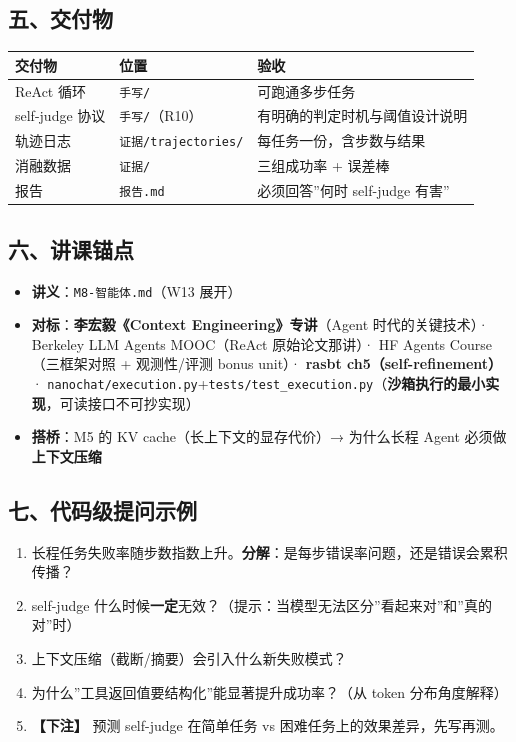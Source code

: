 \documentclass[
  chinese,
  11pt,
]{ctexart}
\newcounter{none} %
\providecommand{\tightlist}{%
  \setlength{\itemsep}{0pt}\setlength{\parskip}{0pt}}
\begin{document}
\subsection{五、交付物}\label{ux4e94ux4ea4ux4ed8ux7269-8}

{\def\LTcaptype{none} %
\begin{longtable}[]{@{}lll@{}}
\toprule\noalign{}
交付物 & 位置 & 验收 \\
\midrule\noalign{}
\endhead
\bottomrule\noalign{}
\endlastfoot
ReAct 循环 & \texttt{手写/} & 可跑通多步任务 \\
self-judge 协议 & \texttt{手写/}（R10） & 有明确的判定时机与阈值设计说明 \\
轨迹日志 & \texttt{证据/trajectories/} & 每任务一份，含步数与结果 \\
消融数据 & \texttt{证据/} & 三组成功率 + 误差棒 \\
报告 & \texttt{报告.md} & 必须回答''何时 self-judge 有害'' \\
\end{longtable}
}

\subsection{六、讲课锚点}\label{ux516dux8bb2ux8bfeux951aux70b9-7}

\begin{itemize}
\tightlist
\item
  \textbf{讲义}：\texttt{M8-智能体.md}（W13 展开）
\item
  \textbf{对标}：\textbf{李宏毅《Context Engineering》专讲}（Agent 时代的关键技术）· Berkeley LLM Agents MOOC（ReAct 原始论文那讲）· HF Agents Course（三框架对照 + 观测性/评测 bonus unit）· \textbf{rasbt ch5（self-refinement）} · \texttt{nanochat/execution.py}+\texttt{tests/test\_execution.py}（\textbf{沙箱执行的最小实现}，可读接口不可抄实现）
\item
  \textbf{搭桥}：M5 的 KV cache（长上下文的显存代价）→ 为什么长程 Agent 必须做\textbf{上下文压缩}
\end{itemize}

\subsection{七、代码级提问示例}\label{ux4e03ux4ee3ux7801ux7ea7ux63d0ux95eeux793aux4f8b-7}

\begin{enumerate}
\def\labelenumi{\arabic{enumi}.}
\tightlist
\item
  长程任务失败率随步数指数上升。\textbf{分解}：是每步错误率问题，还是错误会累积传播？
\item
  self-judge 什么时候\textbf{一定}无效？（提示：当模型无法区分''看起来对''和''真的对''时）
\item
  上下文压缩（截断/摘要）会引入什么新失败模式？
\item
  为什么''工具返回值要结构化''能显著提升成功率？（从 token 分布角度解释）
\item
  \textbf{【下注】} 预测 self-judge 在简单任务 vs 困难任务上的效果差异，先写再测。
\end{enumerate}
\end{document}
